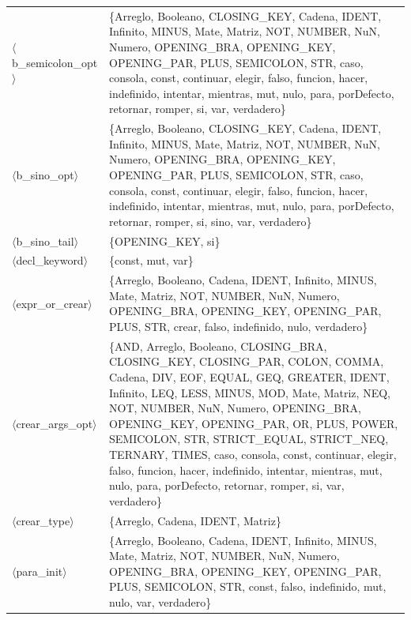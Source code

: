 \documentclass[10pt]{article}
\begin{document}
{\begin{longtable}{@{} p{3.5cm} p{13cm} @{}}
  \parbox[t]{3.3cm}{\raggedright$\langle$b\_\allowbreak{}semicolon\_\allowbreak{}opt$\rangle$} & \{Arreglo, Booleano, CLOSING\_KEY, Cadena, IDENT, Infinito, MINUS, Mate, Matriz, NOT, NUMBER, NuN, Numero, OPENING\_BRA, OPENING\_KEY, OPENING\_PAR, PLUS, SEMICOLON, STR, caso, consola, const, continuar, elegir, falso, funcion, hacer, indefinido, intentar, mientras, mut, nulo, para, porDefecto, retornar, romper, si, var, verdadero\} \\
  \parbox[t]{3.3cm}{\raggedright$\langle$b\_\allowbreak{}sino\_\allowbreak{}opt$\rangle$} & \{Arreglo, Booleano, CLOSING\_KEY, Cadena, IDENT, Infinito, MINUS, Mate, Matriz, NOT, NUMBER, NuN, Numero, OPENING\_BRA, OPENING\_KEY, OPENING\_PAR, PLUS, SEMICOLON, STR, caso, consola, const, continuar, elegir, falso, funcion, hacer, indefinido, intentar, mientras, mut, nulo, para, porDefecto, retornar, romper, si, sino, var, verdadero\} \\
  \parbox[t]{3.3cm}{\raggedright$\langle$b\_\allowbreak{}sino\_\allowbreak{}tail$\rangle$} & \{OPENING\_KEY, si\} \\
  \parbox[t]{3.3cm}{\raggedright$\langle$decl\_\allowbreak{}keyword$\rangle$} & \{const, mut, var\} \\
  \parbox[t]{3.3cm}{\raggedright$\langle$expr\_\allowbreak{}or\_\allowbreak{}crear$\rangle$} & \{Arreglo, Booleano, Cadena, IDENT, Infinito, MINUS, Mate, Matriz, NOT, NUMBER, NuN, Numero, OPENING\_BRA, OPENING\_KEY, OPENING\_PAR, PLUS, STR, crear, falso, indefinido, nulo, verdadero\} \\
  \parbox[t]{3.3cm}{\raggedright$\langle$crear\_\allowbreak{}args\_\allowbreak{}opt$\rangle$} & \{AND, Arreglo, Booleano, CLOSING\_BRA, CLOSING\_KEY, CLOSING\_PAR, COLON, COMMA, Cadena, DIV, EOF, EQUAL, GEQ, GREATER, IDENT, Infinito, LEQ, LESS, MINUS, MOD, Mate, Matriz, NEQ, NOT, NUMBER, NuN, Numero, OPENING\_BRA, OPENING\_KEY, OPENING\_PAR, OR, PLUS, POWER, SEMICOLON, STR, STRICT\_EQUAL, STRICT\_NEQ, TERNARY, TIMES, caso, consola, const, continuar, elegir, falso, funcion, hacer, indefinido, intentar, mientras, mut, nulo, para, porDefecto, retornar, romper, si, var, verdadero\} \\
  \parbox[t]{3.3cm}{\raggedright$\langle$crear\_\allowbreak{}type$\rangle$} & \{Arreglo, Cadena, IDENT, Matriz\} \\
  \parbox[t]{3.3cm}{\raggedright$\langle$para\_\allowbreak{}init$\rangle$} & \{Arreglo, Booleano, Cadena, IDENT, Infinito, MINUS, Mate, Matriz, NOT, NUMBER, NuN, Numero, OPENING\_BRA, OPENING\_KEY, OPENING\_PAR, PLUS, SEMICOLON, STR, const, falso, indefinido, mut, nulo, var, verdadero\} \\

\end{longtable}}
\end{document}
